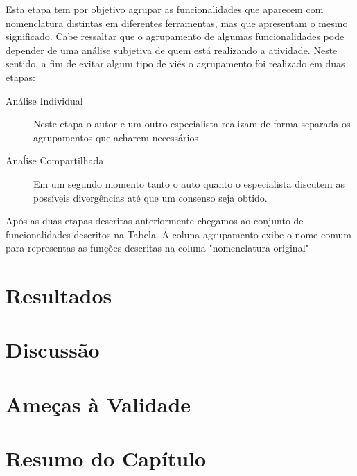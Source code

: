 Esta etapa tem por objetivo agrupar as funcionalidades que aparecem com nomenclatura distintas em
diferentes ferramentas, mas que apresentam o mesmo significado. Cabe ressaltar que o agrupamento de
algumas funcionalidades pode depender de uma análise subjetiva de quem está realizando a atividade.
Neste sentido, a fim de evitar algum tipo de viés o agrupamento foi realizado em duas etapas:

\begin{description}
	\item[Análise Individual] Neste etapa o autor e um outro especialista realizam de forma separada
		os agrupamentos que acharem necessários
	\item[Anaĺise Compartilhada] Em um segundo momento tanto o auto quanto o especialista discutem
		as possíveis divergências até que um consenso seja obtido.	
\end{description}

Após as duas etapas descritas anteriormente chegamos ao conjunto de funcionalidades descritos na
Tabela. A coluna agrupamento exibe o nome comum para representas as funções descritas na coluna
"nomenclatura original"


\section{Resultados}
\label{sec:resultados}



\section{Discussão}
\label{sec:discussao}

\section{Ameças à Validade}
\label{sec:ameacas_a_validade}


\section{Resumo do Capítulo}
\label{sec:resumo_do_capitulo}